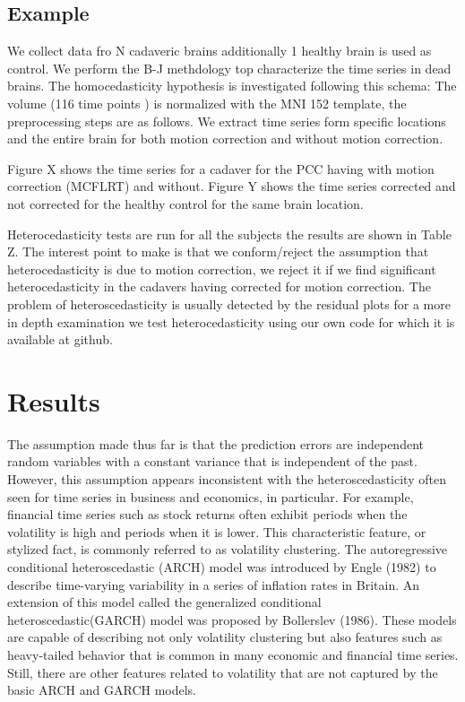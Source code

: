 \documentclass[10pt,letterpaper]{article}
\begin{document}

\subsection*{Example}
We collect data fro N cadaveric brains additionally 1 healthy brain is used as control.
We perform the B-J methdology top characterize the time series in dead brains. The homocedasticity hypothesis is investigated following this schema:
The volume (116 time points ) is normalized with the MNI 152 template, the preprocessing steps are as follows. We extract time series form specific locations and the entire brain for both motion correction and without motion correction.

Figure X shows the time series for a cadaver for the PCC having with motion correction (MCFLRT) and without. Figure Y shows the time series corrected and not corrected for the healthy control for the same brain location.
 
Heterocedasticity tests are run for all the subjects the results are shown in Table Z.
The interest point to make is that we conform/reject the assumption that heterocedasticity is due to motion correction, we reject it if we find significant heterocedasticity in the cadavers having corrected for motion correction. The problem of heteroscedasticity is usually detected by the residual plots for a more in depth examination we test heterocedasticity using our own code for  which it is available at github.


 
\section*{Results}

The assumption made thus far is that the prediction errors are independent random variables with a constant variance that is independent of the past. However, this assumption appears inconsistent with the heteroscedasticity often seen for time series in business and economics, in particular.
For example, financial time series such as stock returns often exhibit periods when the volatility is high and periods when it is lower. This characteristic feature, or stylized fact, is commonly referred to as volatility clustering.
The autoregressive conditional heteroscedastic (ARCH) model was introduced by Engle
(1982) to describe time-varying variability in a series of inflation rates in Britain. An extension of this model called the generalized conditional heteroscedastic(GARCH) model was proposed by Bollerslev (1986). These models are capable of describing not only volatility clustering but also features such as heavy-tailed behavior that is common in many economic and financial time series. Still, there are other features related to volatility that are not captured by the basic ARCH and GARCH models.
\end{document}
